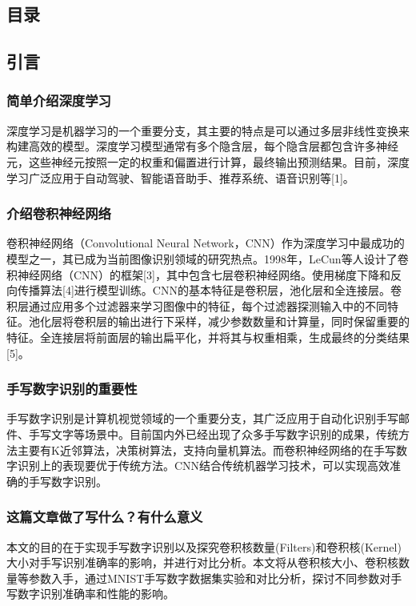 \documentclass[11pt]{article}
\begin{document}
\subsection{目录}
\label{sec:org9d79cd9}
\subsection{引言}
\label{sec:org72763b9}
\subsubsection{简单介绍深度学习}
\label{sec:org582270f}
深度学习是机器学习的一个重要分支，其主要的特点是可以通过多层非线性变换来构建高效的模型。深度学习模型通常有多个隐含层，每个隐含层都包含许多神经元，这些神经元按照一定的权重和偏置进行计算，最终输出预测结果。目前，深度学习广泛应用于自动驾驶、智能语音助手、推荐系统、语音识别等[1]。
\subsubsection{介绍卷积神经网络}
\label{sec:org6963c97}
卷积神经网络（Convolutional Neural Network，CNN）作为深度学习中最成功的模型之一，其已成为当前图像识别领域的研究热点。1998年，LeCun等人设计了卷积神经网络（CNN）的框架[3]，其中包含七层卷积神经网络。使用梯度下降和反向传播算法[4]进行模型训练。CNN的基本特征是卷积层，池化层和全连接层。卷积层通过应用多个过滤器来学习图像中的特征，每个过滤器探测输入中的不同特征。池化层将卷积层的输出进行下采样，减少参数数量和计算量，同时保留重要的特征。全连接层将前面层的输出扁平化，并将其与权重相乘，生成最终的分类结果[5]。
\subsubsection{手写数字识别的重要性}
\label{sec:orgf8c5ea5}
手写数字识别是计算机视觉领域的一个重要分支，其广泛应用于自动化识别手写邮件、手写文字等场景中。目前国内外已经出现了众多手写数字识别的成果，传统方法主要有K近邻算法，决策树算法，支持向量机算法。而卷积神经网络的在手写数字识别上的表现要优于传统方法。CNN结合传统机器学习技术，可以实现高效准确的手写数字识别。
\subsubsection{这篇文章做了写什么？有什么意义}
\label{sec:orge500686}
本文的目的在于实现手写数字识别以及探究卷积核数量(Filters)和卷积核(Kernel)大小对手写识别准确率的影响，并进行对比分析。本文将从卷积核大小、卷积核数量等参数入手，通过MNIST手写数字数据集实验和对比分析，探讨不同参数对手写数字识别准确率和性能的影响。
\end{document}
